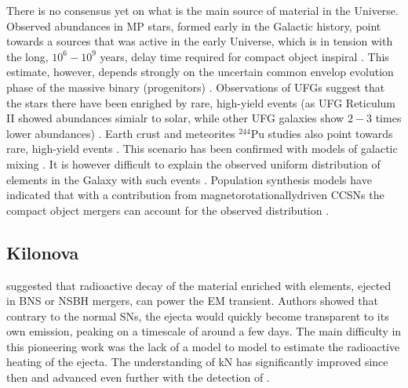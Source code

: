 There is no consensus yet on what is the main source of \rproc{} material in the 
Universe. 
Observed \rproc{} abundances in \ac{MP} stars, formed early in the Galactic history, 
point towards a sources that was active in the early Universe, which is in tension with the long, 
$10^{6} - 10^{9}$ years, delay time required for compact object inspiral 
\citep{DeDonder:2004cx,Dominik:2012kk}. This estimate, however, depends strongly on the 
uncertain common envelop evolution phase of the massive binary (progenitors)
\citep[\eg][]{Dominik:2012kk}.
%
Observations of \acp{UFG} suggest that the stars there have been enrighed by rare, 
high-yield events (as \ac{UFG} Reticulum II showed abundances simialr to solar, 
while other \ac{UFG} galaxies show $2-3$ times lower abundances) \citep{Ji:2016}.
%
Earth crust and meteorites $^{244}$Pu studies also point towards rare, high-yield 
events \citep{Wallner:2015,Tsujimoto:2017}. This scenario has been confirmed with 
models of galactic mixing \citep{Hotokezaka:2015zea}.
%
It is however difficult to explain the observed uniform distribution of \rproc{} 
elements in the Galaxy with such events \citep{Argast:2003he}.
%
Population synthesis models have indicated that with a contribution from 
magnetorotationallydriven \acp{CCSN} the compact object mergers can account for the 
observed distribution \citep{Ishimaru:2015,Cescutti:2015,Wehmeyer:2015,VanDeVoort:2015}.



\subsection{Kilonova} \label{sec:intro:kilonova}


\citet{Li:1998bw} suggested that 
radioactive decay of the material enriched with \rproc{} elements,
ejected in \ac{BNS} or \ac{NSBH} mergers,
can power the \ac{EM} transient.
%
Authors showed that contrary to the normal \acp{SN}, 
the ejecta would quickly become transparent to its own emission, peaking on a timescale 
of around a few days. 
%
The main difficulty in this pioneering work was the lack of a \nuc{}
model to model to estimate the radioactive heating of the ejecta. 
%
The understanding of \ac{kN} has significantly improved since then
\citep[\eg][]{Kulkarni:2005jw,Metzger:2010,Roberts:2011,Metzger:2016pju,Wollaeger:2017ahm} 
and advanced even further with the detection of \AT{} \citep[\eg][]{Metzger:2019zeh}.


